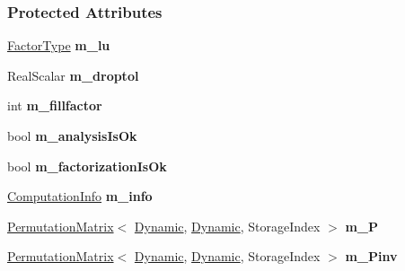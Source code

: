 \subsubsection*{Protected Attributes}
\begin{DoxyCompactItemize}
\item 
\mbox{\label{group___iterative_linear_solvers___module_ae2f1c31f87874392c955fab460511d21}} 
\hyperlink{group___sparse_core___module}{Factor\+Type} {\bfseries m\+\_\+lu}
\item 
\mbox{\label{group___iterative_linear_solvers___module_a5eb0796236f8b99cf24a991b4fe31813}} 
Real\+Scalar {\bfseries m\+\_\+droptol}
\item 
\mbox{\label{group___iterative_linear_solvers___module_a40e52676389d807c3033de03bbd7b90a}} 
int {\bfseries m\+\_\+fillfactor}
\item 
\mbox{\label{group___iterative_linear_solvers___module_a3e304af30544b5e1b3396d017a657b26}} 
bool {\bfseries m\+\_\+analysis\+Is\+Ok}
\item 
\mbox{\label{group___iterative_linear_solvers___module_a3f28ba1a776a45e098ddfc35425710b7}} 
bool {\bfseries m\+\_\+factorization\+Is\+Ok}
\item 
\mbox{\label{group___iterative_linear_solvers___module_a7d2cda3cd944579c417a9adf423edc9f}} 
\hyperlink{group__enums_ga85fad7b87587764e5cf6b513a9e0ee5e}{Computation\+Info} {\bfseries m\+\_\+info}
\item 
\mbox{\label{group___iterative_linear_solvers___module_a42a409d58826df73bd114f62ec807c7d}} 
\hyperlink{group___core___module_class_eigen_1_1_permutation_matrix}{Permutation\+Matrix}$<$ \hyperlink{namespace_eigen_ad81fa7195215a0ce30017dfac309f0b2}{Dynamic}, \hyperlink{namespace_eigen_ad81fa7195215a0ce30017dfac309f0b2}{Dynamic}, Storage\+Index $>$ {\bfseries m\+\_\+P}
\item 
\mbox{\label{group___iterative_linear_solvers___module_a2477077515df953714c5cc11a84cd99f}} 
\hyperlink{group___core___module_class_eigen_1_1_permutation_matrix}{Permutation\+Matrix}$<$ \hyperlink{namespace_eigen_ad81fa7195215a0ce30017dfac309f0b2}{Dynamic}, \hyperlink{namespace_eigen_ad81fa7195215a0ce30017dfac309f0b2}{Dynamic}, Storage\+Index $>$ {\bfseries m\+\_\+\+Pinv}
\end{DoxyCompactItemize}


